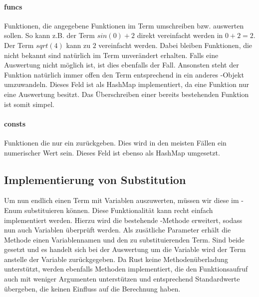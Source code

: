 \documentclass[11pt,a4paper, ngerman]{article}
\begin{document}
\paragraph{funcs} Funktionen, die angegebene Funktionen im Term umschreiben bzw. auswerten sollen. So kann z.B. der Term $sin(0) + 2$ direkt vereinfacht werden in $0 + 2 = 2$. Der Term $sqrt(4)$ kann zu $2$ vereinfacht werden. Dabei bleiben Funktionen, die  nicht bekannt sind natürlich im Term unverändert erhalten. Falls eine Auswertung nicht möglich ist, ist dies ebenfalls der Fall. Ansonsten steht der Funktion natürlich immer offen den Term entsprechend in ein anderes -Objekt umzuwandeln. Dieses Feld ist als HashMap implementiert, da eine Funktion nur eine Auswertung besitzt. Das Überschreiben einer bereits bestehenden Funktion ist somit simpel.

\paragraph{consts} Funktionen die nur ein  zurückgeben. Dies wird in den meisten Fällen ein numerischer Wert sein. Dieses Feld ist ebenso als HashMap umgesetzt.

\subsection{Implementierung von Substitution} Um nun endlich einen Term mit Variablen auszuwerten, müssen wir diese im -Enum substituieren können. Diese Funktionalität kann recht einfach implementiert werden. Hierzu wird die bestehende -Methode erweitert, sodass nun auch Variablen überprüft werden. Als zusätliche Parameter erhält die Methode einen Variablennamen und den zu substituierenden Term. Sind beide gesetzt und es handelt sich bei der Auswertung um die Variable wird der Term anstelle der Variable zurückgegeben. Da Rust keine Methodenüberladung unterstützt, werden ebenfalls Methoden implementiert, die den Funktionsaufruf auch mit weniger Argumenten unterstützen und entsprechend Standardwerte übergeben, die keinen Einfluss auf die Berechnung haben.
\end{document}
